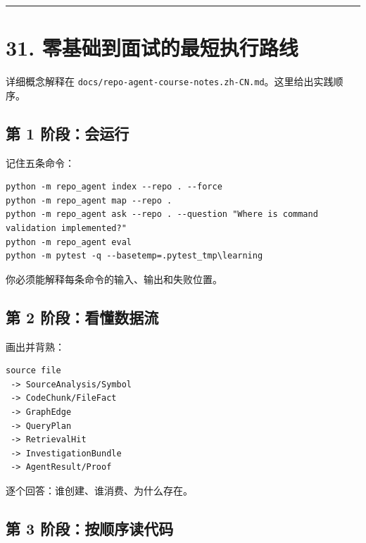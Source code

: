 \documentclass[UTF8,12pt,openany]{ctexbook}
\begin{document}
\hrule

\section{31. 零基础到面试的最短执行路线}

详细概念解释在 \texttt{docs/repo-agent-course-notes.zh-CN.md}。这里给出实践顺序。\par

\subsection{第 1 阶段：会运行}

记住五条命令：\par

\begin{lstlisting}
python -m repo_agent index --repo . --force
python -m repo_agent map --repo .
python -m repo_agent ask --repo . --question "Where is command validation implemented?"
python -m repo_agent eval
python -m pytest -q --basetemp=.pytest_tmp\learning
\end{lstlisting}

你必须能解释每条命令的输入、输出和失败位置。\par

\subsection{第 2 阶段：看懂数据流}

画出并背熟：\par

\begin{lstlisting}
source file
 -> SourceAnalysis/Symbol
 -> CodeChunk/FileFact
 -> GraphEdge
 -> QueryPlan
 -> RetrievalHit
 -> InvestigationBundle
 -> AgentResult/Proof
\end{lstlisting}

逐个回答：谁创建、谁消费、为什么存在。\par

\subsection{第 3 阶段：按顺序读代码}
\end{document}
